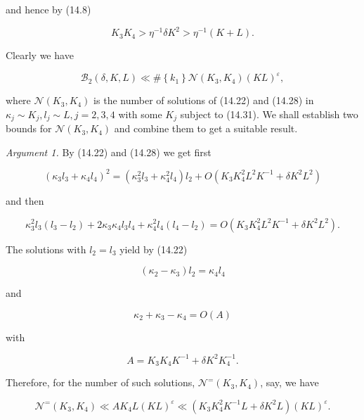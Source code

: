 \documentclass[10pt]{article}
\begin{document}
and hence by (14.8)


\begin{equation*}
K_{3} K_{4}>\eta^{-1} \delta K^{2}>\eta^{-1}(K+L) . \tag{14.32}
\end{equation*}


Clearly we have


\begin{equation*}
\mathscr{B}_{2}(\delta,K,L)\ll\#\left\{k_{1}\right\} \mathscr{N}\left(K_{3}, K_{4}\right)(K L)^{\varepsilon}, \tag{14.33}
\end{equation*}


where $\mathscr{N}\left(K_{3}, K_{4}\right)$ is the number of solutions of (14.22) and (14.28) in $\kappa_{j} \sim K_{j}, l_{j} \sim L, j=2,3,4$ with some $K_{j}$ subject to (14.31). We shall establish two bounds for $\mathscr{N}\left(K_{3}, K_{4}\right)$ and combine them to get a suitable result.

\medskip\noindent\textit{Argument 1.} By (14.22) and (14.28) we get first

$$
\left(\kappa_{3} l_{3}+\kappa_{4} l_{4}\right)^{2}=\left(\kappa_{3}^{2} l_{3}+\kappa_{4}^{2} l_{4}\right) l_{2}+O\left(K_{3} K_{4}^{2} L^{2} K^{-1}+\delta K^{2} L^{2}\right)
$$

and then


\begin{equation*}
\kappa_{3}^{2} l_{3}\left(l_{3}-l_{2}\right)+2 \kappa_{3} \kappa_{4} l_{3} l_{4}+\kappa_{4}^{2} l_{4}\left(l_{4}-l_{2}\right)=O\left(K_{3} K_{4}^{2} L^{2} K^{-1}+\delta K^{2} L^{2}\right) . \tag{14.34}
\end{equation*}


The solutions with $l_{2}=l_{3}$ yield by (14.22)

$$
\left(\kappa_{2}-\kappa_{3}\right) l_{2}=\kappa_{4} l_{4}
$$

and

$$
\kappa_{2}+\kappa_{3}-\kappa_{4}=O(A)
$$

with


\begin{equation*}
A=K_{3} K_{4} K^{-1}+\delta K^{2} K_{4}^{-1} . \tag{14.35}
\end{equation*}


Therefore, for the number of such solutions, $\mathscr{N}^{=}(K_{3},K_{4})$, say, we have


\begin{equation*}
\mathscr{N}^{=}\left(K_{3}, K_{4}\right) \ll A K_{4} L(K L)^{\varepsilon} \ll\left(K_{3} K_{4}^{2} K^{-1} L+\delta K^{2} L\right)(K L)^{\varepsilon} . \tag{14.36}
\end{equation*}
\end{document}
